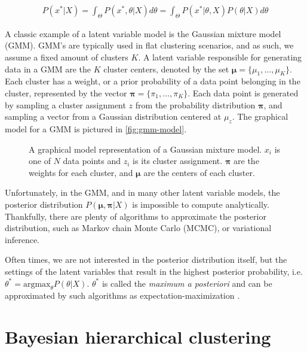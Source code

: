 \documentclass{article}
\begin{document}
\begin{align}
  P(x^* | X) = \int_\Theta P(x^*, \theta | X)d\theta =  \int_\Theta P(x^* | \theta, X)P(\theta | X)d\theta
\end{align}


A classic example of a latent variable model
is the Gaussian mixture model (GMM).
GMM's are typically used in flat clustering scenarios,
and as such, we assume a fixed amount of clusters $K$.
A latent variable responsible for generating
data in a GMM are
the $K$ cluster centers, denoted by the set
$\bm{\mu} = \{\mu_1, \ldots, \mu_K\}$.
Each cluster has a weight, or a prior probability
of a data point belonging in the cluster,
represented by the vector $\bm{\pi} = \{\pi_1,\ldots,\pi_K\}$.
Each data point is generated by sampling a cluster
assignment $z$ from the probability distribution $\bm{\pi}$,
and sampling a vector from a Gaussian distribution
centered at $\mu_z$.
The graphical model for a GMM is pictured in \autoref{fig:gmm-model}.

\begin{figure}[H]
  \centering
  
  \caption{A graphical model representation of a Gaussian mixture model. $x_i$ is
  one of $N$ data points and $z_i$ is its cluster assignment. $\bm{\pi}$ are the weights
  for each cluster, and $\bm{\mu}$ are the centers of each cluster.}
\label{fig:gmm-model}
\end{figure}

Unfortunately, in the GMM,
and in many other latent variable models,
the posterior distribution $P(\bm{\mu}, \bm{\pi} | X)$
is impossible to compute analytically.
Thankfully, there are plenty of
algorithms to approximate the posterior distribution,
such as
Markov chain
Monte Carlo (MCMC), or variational
inference.

Often times, we are not interested in the posterior
distribution itself, but the settings of the latent variables
that result in the highest posterior probability, i.e.
$\theta^* = \text{argmax}_\theta P(\theta | X)$.
$\theta^*$ is called the \emph{maximum a posteriori}
and can be approximated 
by such algorithms as
expectation-maximization \citep{Dempster1977}.

\section{Bayesian hierarchical clustering}
\end{document}

